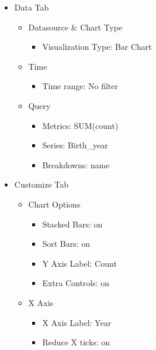 \documentclass[
]{book}
\providecommand{\tightlist}{%
  \setlength{\itemsep}{0pt}\setlength{\parskip}{0pt}}
\begin{document}
\begin{itemize}
\tightlist
\item
  Data Tab

  \begin{itemize}
  \tightlist
  \item
    Datasource \& Chart Type

    \begin{itemize}
    \tightlist
    \item
      Visualization Type: Bar Chart
    \end{itemize}
  \item
    Time

    \begin{itemize}
    \tightlist
    \item
      Time range: No filter
    \end{itemize}
  \item
    Query

    \begin{itemize}
    \tightlist
    \item
      Metrics: SUM(count)
    \item
      Series: Birth\_year
    \item
      Breakdowns: name
    \end{itemize}
  \end{itemize}
\item
  Customize Tab

  \begin{itemize}
  \tightlist
  \item
    Chart Options

    \begin{itemize}
    \tightlist
    \item
      Stacked Bars: on
    \item
      Sort Bars: on
    \item
      Y Axis Label: Count
    \item
      Extra Controls: on
    \end{itemize}
  \item
    X Axis

    \begin{itemize}
    \tightlist
    \item
      X Axis Label: Year
    \item
      Reduce X ticks: on
    \end{itemize}
  \end{itemize}
\end{itemize}
\end{document}
